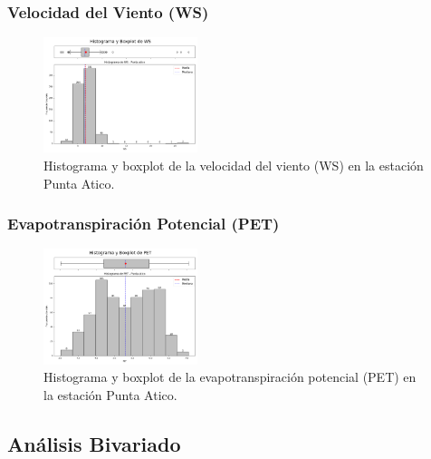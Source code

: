 \subsubsection*{Velocidad del Viento (WS)}
\begin{figure}[H]
\centering
\includegraphics[width=0.4\textwidth]{resultados/por_estacion_meteorologica/Punta_Atico/WS_histograma.png}
\caption{Histograma y boxplot de la velocidad del viento (WS) en la estación Punta Atico.}
\label{fig:punta_atico_WS}
\end{figure}

\subsubsection*{Evapotranspiración Potencial (PET)}
\begin{figure}[H]
\centering
\includegraphics[width=0.4\textwidth]{resultados/por_estacion_meteorologica/Punta_Atico/PET_histograma.png}
\caption{Histograma y boxplot de la evapotranspiración potencial (PET) en la estación Punta Atico.}
\label{fig:punta_atico_PET}
\end{figure}

\subsection{Análisis Bivariado}

